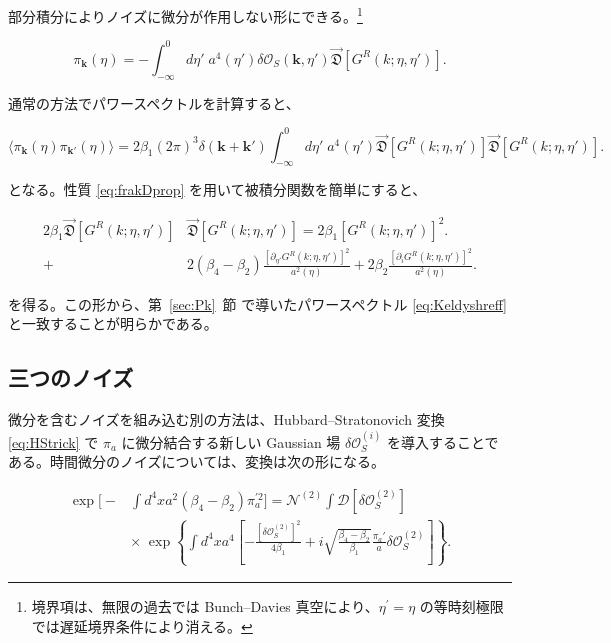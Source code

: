 \documentclass[a4paper,11pt]{ltjsarticle}
\numberwithin{equation}{section}
\def\pia{\pi_{a}}
\def\bfk{\textbf{k}}
\newcommand{\Os}{\delta \mathcal{O}_{S}}
\newcommand{\Sec}[1]{Sec.~\ref{#1}}
\renewcommand{\Sec}[1]{第~\ref{#1}~節}
\begin{document}
部分積分によりノイズに微分が作用しない形にできる。\footnote{境界項は、無限の過去では Bunch--Davies 真空により、$\eta^\prime=\eta$ の等時刻極限では遅延境界条件により消える。}

\begin{equation}
\pi_{\bfk}(\eta)=-\int_{-\infty}^{0}d\eta'\; a^{4}(\eta')\delta\mathcal{O}_{S}(\bfk,\eta')\overset{\rightarrow}{\mathfrak{D}}\left[G^{R}(k;\eta,\eta')\right].
\end{equation}

通常の方法でパワースペクトルを計算すると、

\begin{equation}
\langle\pi_{\bfk}(\eta)\pi_{\bfk'}(\eta)\rangle=2\beta_{1}(2\pi)^3{\delta}(\bfk+\bfk')\int_{-\infty}^{0} d\eta'\;a^{4}(\eta')\overset{\rightarrow}{\mathfrak{D}}\left[G^{R}(k;\eta,\eta')\right]\overset{\rightarrow}{\mathfrak{D}}\left[G^{R}(k;\eta,\eta')\right].
\end{equation}

となる。性質 \eqref{eq:frakDprop} を用いて被積分関数を簡単にすると、

\begin{align}
2\beta_{1}\overset{\rightarrow}{\mathfrak{D}}\left[G^{R}(k;\eta,\eta')\right]&\overset{\rightarrow}{\mathfrak{D}}\left[G^{R}(k;\eta,\eta')\right]= 2\beta_{1}\left[G^{R}(k;\eta,\eta')\right]^{2} \Bigg.\\
+&2(\beta_{4}-\beta_{2})\frac{\left[\partial_{\eta'}G^{R}(k;\eta,\eta')\right]^{2}}{a^{2}(\eta)}+2\beta_{2}\frac{\left[\partial_{i}G^{R}(k;\eta,\eta')\right]^{2}}{a^{2}(\eta)}.\nonumber
\end{align}

を得る。この形から、\Sec{sec:Pk} で導いたパワースペクトル \eqref{eq:Keldyshreff} と一致することが明らかである。

\subsection*{三つのノイズ}

微分を含むノイズを組み込む別の方法は、Hubbard--Stratonovich 変換 \eqref{eq:HStrick} で $\pia$ に微分結合する新しい Gaussian 場 $\Os^{(i)}$ を導入することである。時間微分のノイズについては、変換は次の形になる。

\begin{align}
\exp\Bigg[-&\int d^{4}x a^{2}(\beta_{4}-\beta_{2})\pia^{\prime2}\Bigg]=\mathcal{N}^{(2)}\int\mathcal{D}[\Os^{(2)}]\\
&\times\;\exp\left\{\int d^{4}x a^{4}\left[-\frac{[\Os^{(2)}]^{2}}{4\beta_{1}}+i\sqrt{\frac{\beta_{4}-\beta_{2}}{\beta_{1}}}\frac{\pia'}{a}\Os^{(2)}\right]\right\}.\nonumber
\end{align}
\end{document}
